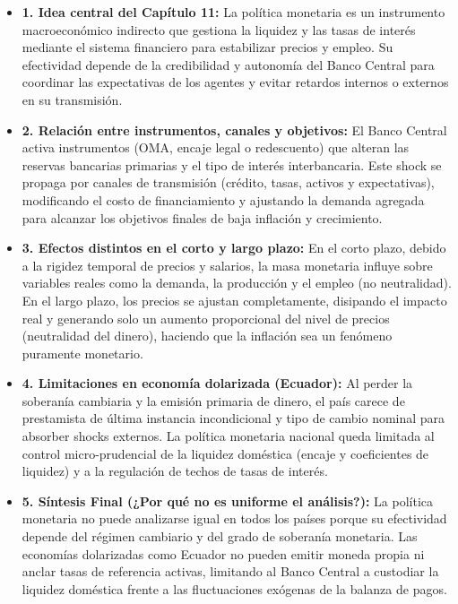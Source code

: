 \documentclass[12pt,spanish]{article}
\providecommand{\tightlist}{%
  \setlength{\itemsep}{0pt}\setlength{\parskip}{0pt}}
\begin{document}
\begin{itemize}
\tightlist
\item
  \textbf{1. Idea central del Capítulo 11:} La política monetaria es un
  instrumento macroeconómico indirecto que gestiona la liquidez y las
  tasas de interés mediante el sistema financiero para estabilizar
  precios y empleo. Su efectividad depende de la credibilidad y
  autonomía del Banco Central para coordinar las expectativas de los
  agentes y evitar retardos internos o externos en su transmisión.
\item
  \textbf{2. Relación entre instrumentos, canales y objetivos:} El Banco
  Central activa instrumentos (OMA, encaje legal o redescuento) que
  alteran las reservas bancarias primarias y el tipo de interés
  interbancaria. Este shock se propaga por canales de transmisión
  (crédito, tasas, activos y expectativas), modificando el costo de
  financiamiento y ajustando la demanda agregada para alcanzar los
  objetivos finales de baja inflación y crecimiento.
\item
  \textbf{3. Efectos distintos en el corto y largo plazo:} En el corto
  plazo, debido a la rigidez temporal de precios y salarios, la masa
  monetaria influye sobre variables reales como la demanda, la
  producción y el empleo (no neutralidad). En el largo plazo, los
  precios se ajustan completamente, disipando el impacto real y
  generando solo un aumento proporcional del nivel de precios
  (neutralidad del dinero), haciendo que la inflación sea un fenómeno
  puramente monetario.
\item
  \textbf{4. Limitaciones en economía dolarizada (Ecuador):} Al perder
  la soberanía cambiaria y la emisión primaria de dinero, el país carece
  de prestamista de última instancia incondicional y tipo de cambio
  nominal para absorber shocks externos. La política monetaria nacional
  queda limitada al control micro-prudencial de la liquidez doméstica
  (encaje y coeficientes de liquidez) y a la regulación de techos de
  tasas de interés.
\item
  \textbf{5. Síntesis Final (¿Por qué no es uniforme el análisis?):} La
  política monetaria no puede analizarse igual en todos los países
  porque su efectividad depende del régimen cambiario y del grado de
  soberanía monetaria. Las economías dolarizadas como Ecuador no pueden
  emitir moneda propia ni anclar tasas de referencia activas, limitando
  al Banco Central a custodiar la liquidez doméstica frente a las
  fluctuaciones exógenas de la balanza de pagos.
\end{itemize}
\end{document}
